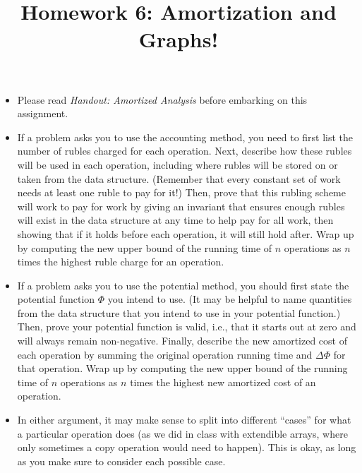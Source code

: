 \documentclass{ks-pset}
\title{Homework 6: Amortization and Graphs!}
\begin{document}
\begin{itemize}

  \item Please read \emph{Handout: Amortized Analysis} before embarking on this
    assignment.

  \item If a problem asks you to use the accounting method, you need to first
    list the number of rubles charged for each operation. Next, describe how
    these rubles will be used in each operation, including where rubles will be
    stored on or taken from the data structure. (Remember that every constant
    set of work needs at least one ruble to pay for it!) Then, prove that this
    rubling scheme will work to pay for work by giving an invariant that
    ensures enough rubles will exist in the data structure at any time to help
    pay for all work, then showing that if it holds before each operation, it
    will still hold after. Wrap up by computing the new upper bound of the
    running time of \(n\) operations as \(n\) times the highest ruble charge
    for an operation.

  \item If a problem asks you to use the potential method, you should first
    state the potential function \(Φ\) you intend to use. (It may be helpful to
    name quantities from the data structure that you intend to use in your
    potential function.) Then, prove your potential function is valid, i.e.,
    that it starts out at zero and will always remain non-negative. Finally,
    describe the new amortized cost of each operation by summing the original
    operation running time and \(ΔΦ\) for that operation. Wrap up by computing
    the new upper bound of the running time of \(n\) operations as \(n\) times
    the highest new amortized cost of an operation.

  \item In either argument, it may make sense to split into different ``cases''
    for what a particular operation does (as we did in class with extendible
    arrays, where only sometimes a copy operation would need to happen). This
    is okay, as long as you make sure to consider each possible case.

\end{itemize}

\newpage
\end{document}
